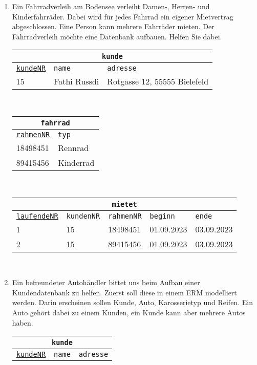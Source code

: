 \begin{Answer}[ref=TabelleErstellen1]
	\begin{enumerate}
		\item Ein Fahrradverleih am Bodensee verleiht Damen-, Herren- und Kinderfahrräder. Dabei wird für jedes Fahrrad ein eigener Mietvertrag abgeschlossen. Eine Person kann mehrere Fahrräder mieten. Der Fahrradverleih möchte eine Datenbank aufbauen. Helfen Sie dabei.\\
		\begin{tabular}{lll}
			\multicolumn{3}{c}{\lstinline!kunde!}\\
			\hline
			\underline{\lstinline!kundeNR!}&\lstinline!name!&\lstinline!adresse!\\
			\hline
			15&Fathi Russdi&Rotgasse 12, 55555 Bielefeld\\
		\end{tabular}\\
		\begin{tabular}{ll}
			\multicolumn{2}{c}{\lstinline!fahrrad!}\\
			\hline
			\underline{\lstinline!rahmenNR!}&\lstinline!typ!\\
			\hline
			18498451&Rennrad\\
			89415456&Kinderrad\\
		\end{tabular}\\
		\begin{tabular}{lllll}
			\multicolumn{5}{c}{\lstinline!mietet!}\\
			\hline
			\underline{\lstinline!laufendeNR!}&\lstinline!kundenNR!&\lstinline!rahmenNR!&\lstinline!beginn!&\lstinline!ende!\\
			\hline
			1&15&18498451&01.09.2023&03.09.2023\\
			2&15&89415456&01.09.2023&03.09.2023\\
		\end{tabular}\\
		\item Ein befreundeter Autohändler bittet uns beim Aufbau einer Kundendatenbank zu helfen. Zuerst soll diese in einem ERM modelliert werden. Darin erscheinen sollen Kunde, Auto, Karosserietyp und Reifen. Ein Auto gehört dabei zu einem Kunden, ein Kunde kann aber mehrere Autos haben.\\
		\begin{tabular}{lll}
			\multicolumn{3}{c}{\lstinline!kunde!}\\
			\hline
			\underline{\lstinline!kundeNR!}&\lstinline!name!&\lstinline!adresse!\\

\end{tabular}
\end{enumerate}
\end{Answer}

